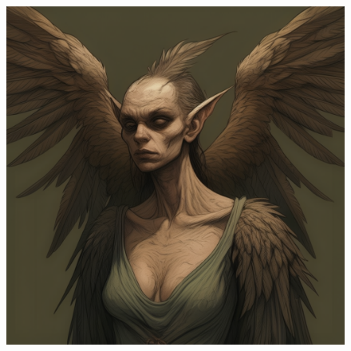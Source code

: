 
\begin{figure}[h]
\begin{center}
\includegraphics[scale=0.24]{img/ai-images/harpy.png}
\end{center}
\end{figure}
